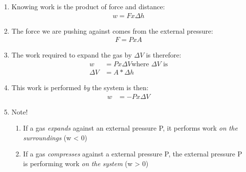 \documentclass{article}  %
\begin{document}
\begin{enumerate}
    \item Knowing work is the product of force and distance:
        \begin{equation*}
            \begin{aligned}
                w = F x \Delta h
            \end{aligned}
        \end{equation*}
    \item The force we are pushing against comes from the external pressure:
        \begin{equation*}
            \begin{aligned}
                F = P x A
            \end{aligned}
        \end{equation*}
    \item The work required to expand the gas by $\Delta V$ is therefore:
        \begin{equation*}
            \begin{aligned}
                w &= P x \Delta V \text{where $\Delta V$ is}\\
                \Delta V &= A * \Delta h
            \end{aligned}
        \end{equation*}
    \item This work is performed \emph{by} the system is then:
        \begin{equation*}
            \begin{aligned}
                w &= -P x \Delta V
            \end{aligned}
        \end{equation*}
    \item Note! 
        \begin{enumerate}
            \item If a gas \emph{expands} against an external pressure P, it performs work \emph{on the surroundings} (w < 0)
            \item If a gas \emph{compresses} against a external pressure P, the external pressure P is performing work \emph{on the system} (w > 0)
        \end{enumerate}
\end{enumerate}
\end{document}

